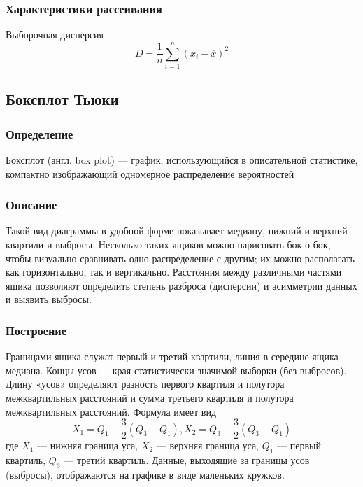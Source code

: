 \documentclass[a4paper]{article}
\begin{document}
    \subsubsection{Характеристики рассеивания}
Выборочная дисперсия
\begin{equation}\label{eq:svar}
    D=\frac{1}{n}\sum_{i=1}^n \left(x_i-\overline{x}\right)^2
\end{equation}

	\subsection{Боксплот Тьюки}
	\subsubsection{Определение}
	\noindent Боксплот (англ. box plot) — график, использующийся в описательной статистике, компактно изображающий одномерное распределение вероятностей

	\subsubsection{Описание}
	\noindent Такой вид диаграммы в удобной форме показывает медиану, нижний и верхний квартили и выбросы. Несколько таких ящиков можно нарисовать бок о бок, чтобы визуально сравнивать одно распределение с другим; их можно располагать как горизонтально, так и вертикально. Расстояния между различными частями ящика позволяют определить степень разброса (дисперсии) и асимметрии данных и выявить выбросы.

	\subsubsection{Построение}
	\noindent Границами ящика служат первый и третий квартили, линия в середине ящика — медиана. Концы усов — края статистически значимой выборки (без выбросов). Длину «усов» определяют разность первого квартиля и полутора межквартильных расстояний и сумма третьего квартиля и полутора межквартильных расстояний. Формула имеет вид
	\begin{equation}
	\label{mouns}
	{X_1 = Q_1-} \frac{3}{2}{(Q_3 - Q_1)},   {X_2 = Q_3+} \frac{3}{2}{(Q_3 - Q_1)}
	\end{equation}
	где $X_1$ — нижняя граница уса, $X_2$ — верхняя граница уса, $Q_1$ — первый квартиль, $Q_3$ — третий квартиль. Данные, выходящие за границы усов (выбросы), отображаются на графике в виде маленьких кружков.
\end{document}
